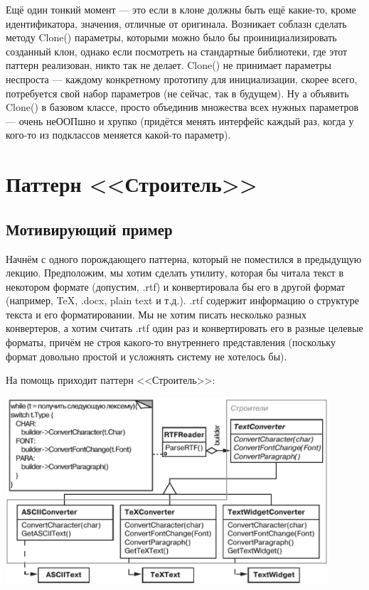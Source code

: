 \documentclass{../../text-style}
\begin{document}
Ещё один тонкий момент --- это если в клоне должны быть ещё какие-то, кроме идентификатора, значения, отличные от оригинала. Возникает соблазн сделать методу Clone() параметры, которыми можно было бы проинициализировать созданный клон, однако если посмотреть на стандартные библиотеки, где этот паттерн реализован, никто так не делает. Clone() не принимает параметры неспроста --- каждому конкретному прототипу для инициализации, скорее всего, потребуется свой набор параметров (не сейчас, так в будущем). Ну а объявить Clone() в базовом классе, просто объединив множества всех нужных параметров --- очень неООПшно и хрупко (придётся менять интерфейс каждый раз, когда у кого-то из подклассов меняется какой-то параметр).

\section{Паттерн <<Строитель>>}

\subsection{Мотивирующий пример}

Начнём с одного порождающего паттерна, который не поместился в предыдущую лекцию. Предположим, мы хотим сделать утилиту, которая бы читала текст в некотором формате (допустим, .rtf) и конвертировала бы его в другой формат (например, TeX, .docx, plain text и т.д.). .rtf содержит информацию о структуре текста и его форматировании. Мы не хотим писать несколько разных конвертеров, а хотим считать .rtf один раз и конвертировать его в разные целевые форматы, причём не строя какого-то внутреннего представления (поскольку формат довольно простой и усложнять систему не хотелось бы).

На помощь приходит паттерн <<Строитель>>:

\begin{center}
    \includegraphics[width=0.9\textwidth]{textConverter.png}
\end{center}
\end{document}
